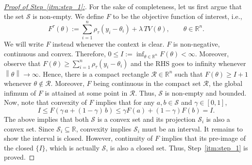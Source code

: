 \documentclass[11pt]{article}
\newcommand{\cS}{\mathcal{S}}
\newcommand{\bR}{\mathbb{R}}
\theoremstyle{plain}
\theoremstyle{definition}
\theoremstyle{remark}
\begin{document}
\begin{proof}[\underline{Proof of Step~\ref{itm:step_1}:}]
For the sake of completeness, let us first argue that the set $\cS$ is non-empty. We define $F$ to be the objective function of interest, i.e., 
\begin{equation}\label{eqn:objective_fn}
    F^{\tau}(\theta):=\sum_{i=1}^{n}\rho_{\tau}(y_i-\theta_i)+\lambda\,TV(\theta),\qquad \theta \in \bR^n.
\end{equation}
We will write $F$ instead whenever the context is clear. $F$ is non-negative, continuous and convex. Therefore,  $0\leq I:=\inf_{\theta \in \bR^n} F(\theta)< \infty$. Moreover, observe that $F(\theta)\geq\sum_{i=1}^{n}\rho_{\tau}(y_i-\theta_i)$ and the RHS goes to infinity whenever $\left\|\theta\right\|\to \infty$. Hence, there is a compact rectangle $\mathcal{R}\in \bR^n$ such that $F(\theta)\geq I+1$ whenever $\theta \notin \mathcal{R}$. Moreover, $F$ being continuous in the compact set $\mathcal{R}$, the global infimum of $F$ is attained at some point in $\mathcal{R}$. Thus, $\cS$ is non-empty and bounded.
Now, note that convexity of $F$ implies that for any $a,b\in \cS$ and $\gamma\in [0,1]$,
\[I\leq F(\gamma\,a+(1-\gamma)\,b)\leq \gamma F(a)+(1-\gamma)F(b)=I.\]
The above implies that both $\cS$ is a convex set and its projection $\cS_i$ is also a convex set. Since $\cS_i\subseteq \bR$, convexity implies $\cS_i$ must be an interval. It remains to show the interval is closed. However, continuity of $F$ implies that its pre-image of the closed $\{I\}$, which is actually $\cS$, is also a closed set. Thus, Step~\ref{itm:step_1} is proved.
\end{proof}
\end{document}

